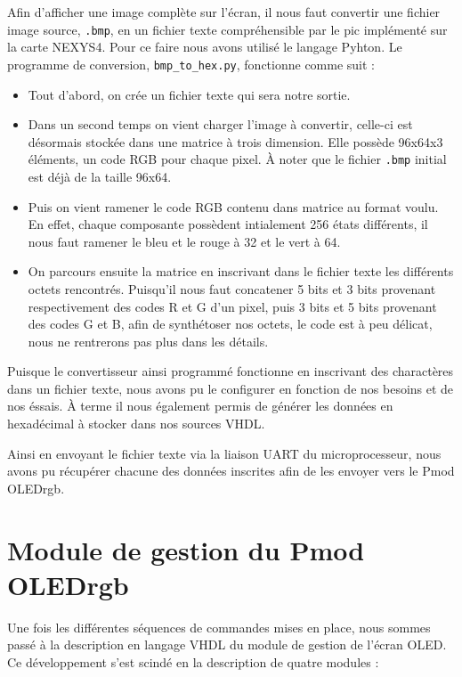 \documentclass[11pt]{article}
\begin{document}
Afin d'afficher une image complète sur l'écran, il nous faut convertir une fichier image source, \texttt{.bmp}, en un fichier texte compréhensible par le pic implémenté sur la carte NEXYS4. Pour ce faire nous avons utilisé le langage Pyhton. Le programme de conversion, \texttt{bmp\_to\_hex.py}, fonctionne comme suit : 
\begin{itemize}
\item[\textbullet]
Tout d'abord, on crée un fichier texte qui sera notre sortie.
\item[\textbullet]
Dans un second temps on vient charger l'image à convertir, celle-ci est désormais stockée dans une matrice à trois dimension. Elle possède 96x64x3 éléments, un code RGB pour chaque pixel. À noter que le fichier \texttt{.bmp} initial est déjà de la taille 96x64.
\item[\textbullet]
Puis on vient ramener le code RGB contenu dans matrice au format voulu. En effet, chaque composante possèdent intialement 256 états différents, il nous faut ramener le bleu et le rouge à 32 et le vert à 64.
\item[\textbullet]
On parcours ensuite la matrice en inscrivant dans le fichier texte les différents octets rencontrés. Puisqu'il nous faut concatener 5 bits et 3 bits provenant respectivement des codes R et G d'un pixel, puis 3 bits et 5 bits provenant des codes G et B, afin de synthétoser nos octets, le code est à peu délicat, nous ne rentrerons pas plus dans les détails.
\end{itemize}
Puisque le convertisseur ainsi programmé fonctionne en inscrivant des charactères dans un fichier texte, nous avons pu le configurer en fonction de nos besoins et de nos éssais. À terme il nous également permis de générer les données en hexadécimal à stocker dans nos sources VHDL.

Ainsi en envoyant le fichier texte via la liaison UART du microprocesseur, nous avons pu récupérer chacune des données inscrites afin de les envoyer vers le Pmod OLEDrgb.

\newpage

\section{Module de gestion du Pmod OLEDrgb}

Une fois les différentes séquences de commandes mises en place, nous sommes passé à la description en langage VHDL du module de gestion de l'écran OLED. Ce développement s'est scindé en la description de quatre modules :
\end{document}
